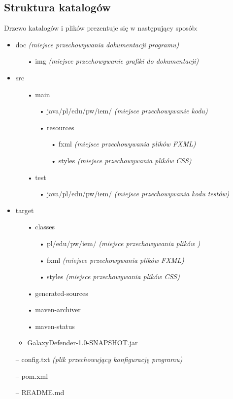 \documentclass[a4paper]{article}
\begin{document}
\subsection{Struktura katalogów}
Drzewo katalogów i plików prezentuje się w następujący sposób:
\begin{itemize}
    \item doc \textit{(miejsce przechowywania dokumentacji programu)}
    \begin{itemize}
        \item[•] img \textit{(miejsce przechowywanie grafiki do dokumentacji)}
    \end{itemize}
    \item src
    \begin{itemize}
        \item[•] main
        \begin{itemize}
            \item[•] java/pl/edu/pw/iem/ \textit{(miejsce przechowywanie kodu)}
            \item[•] resources
            \begin{itemize}
                \item[•] fxml \textit{(miejsce przechowywania plików FXML)}
                \item[•] styles \textit{(miejsce przechowywania plików CSS)}
            \end{itemize}
        \end{itemize}
        \item[•] test
        \begin{itemize}
            \item[•] java/pl/edu/pw/iem/ \textit{(miejsce przechowywania kodu testów)}
        \end{itemize}
    \end{itemize}
    \item target
    \begin{itemize}
        \item[•] classes
        \begin{itemize}
            \item[•] pl/edu/pw/iem/ \textit{(miejsce przechowywania plików )}
            \item[•] fxml \textit{(miejsce przechowywania plików FXML)}
            \item[•] styles \textit{(miejsce przechowywania plików CSS)}
        \end{itemize}
        \item[•] generated-sources
        \item[•] maven-archiver
        \item[•] maven-status
        \item GalaxyDefender-1.0-SNAPSHOT.jar
    \end{itemize}
    \item[--] config.txt \textit{(plik przechowujący konfigurację programu)}
    \item[--] pom.xml
    \item[--] README.md
\end{itemize}
\end{document}
